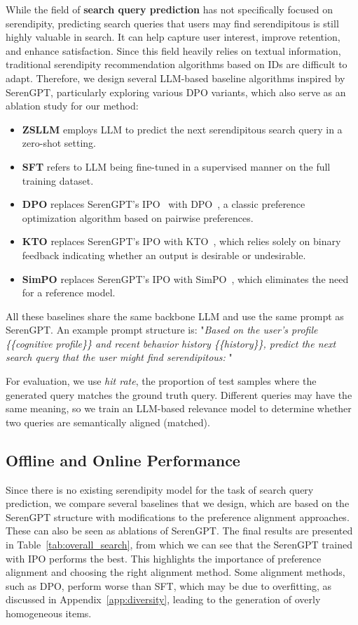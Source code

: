 While the field of \textbf{search query prediction} has not specifically focused on serendipity, predicting search queries that users may find serendipitous is still highly valuable in search. It can help capture user interest, improve retention, and enhance satisfaction. Since this field heavily relies on textual information, traditional serendipity recommendation algorithms based on IDs are difficult to adapt. Therefore, we design several LLM-based baseline algorithms inspired by SerenGPT, particularly exploring various DPO variants, which also serve as an ablation study for our method:
\begin{itemize}
    \item \textbf{ZSLLM} employs LLM to predict the next serendipitous search query in a zero-shot setting.
    \item \textbf{SFT} refers to LLM being fine-tuned in a supervised manner on the full training dataset.
    \item \textbf{DPO} replaces SerenGPT's IPO~\cite{azar2024general} with DPO~\cite{rafailov2024direct}, a classic preference optimization algorithm based on pairwise preferences.
    \item \textbf{KTO} replaces SerenGPT's IPO with KTO~\cite{ethayarajh2024kto}, which relies solely on binary feedback indicating whether an output is desirable or undesirable.
    \item \textbf{SimPO} replaces SerenGPT's IPO with SimPO~\cite{meng2024simpo}, which eliminates the need for a reference model.
\end{itemize}
All these baselines share the same backbone LLM and use the same prompt as SerenGPT. An example prompt structure is: "\textit{Based on the user's profile \{\{cognitive profile\}\} and recent behavior history \{\{history\}\}, predict the next search query that the user might find serendipitous: }" 

For evaluation, we use \textit{hit rate}, the proportion of test samples where the generated query matches the ground truth query. Different queries may have the same meaning, so we train an LLM-based relevance model to determine whether two queries are semantically aligned (matched). 

\subsection{Offline and Online Performance}
Since there is no existing serendipity model for the task of search query prediction, we compare several baselines that we design, which are based on the SerenGPT structure with modifications to the preference alignment approaches. These can also be seen as ablations of SerenGPT. The final results are presented in Table~\ref{tab:overall_search}, from which we can see that the SerenGPT trained with IPO performs the best. This highlights the importance of preference alignment and choosing the right alignment method. Some alignment methods, such as DPO, perform worse than SFT, which may be due to overfitting, as discussed in Appendix~\ref{app:diversity}, leading to the generation of overly homogeneous items.

